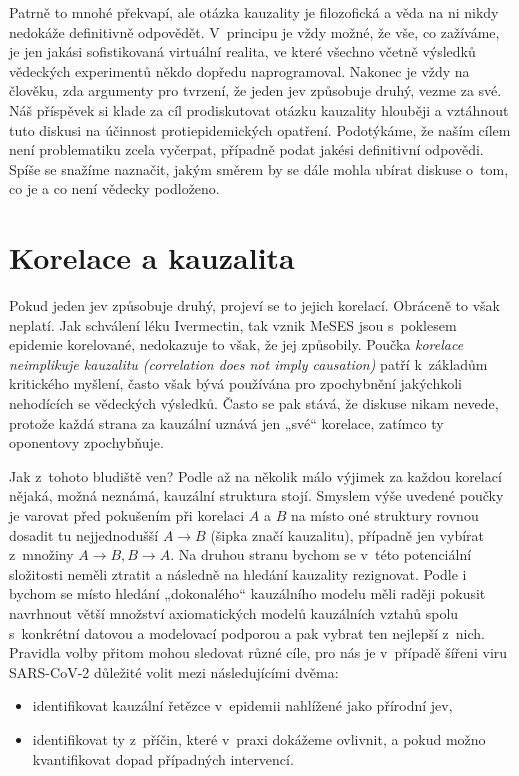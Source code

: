 Patrně to mnohé překvapí, ale otázka kauzality je filozofická a věda na ni nikdy nedokáže definitivně odpovědět. V~principu je vždy možné, že vše, co zažíváme, je jen jakási sofistikovaná
virtuální realita, ve které všechno včetně výsledků vědeckých experimentů
někdo dopředu naprogramoval. Nakonec je vždy na člověku, zda argumenty
pro tvrzení, že jeden jev způsobuje druhý, vezme za své. Náš příspěvek
si klade za cíl prodiskutovat otázku kauzality hlouběji a vztáhnout
tuto diskusi na účinnost
protiepidemických opatření. Podotýkáme, že naším cílem není problematiku
zcela vyčerpat, případně podat jakési definitivní odpovědi. Spíše se snažíme
naznačit, jakým směrem by se dále mohla ubírat diskuse o~tom, co je
a co není vědecky podloženo.

\section*{Korelace a kauzalita}

Pokud jeden jev způsobuje druhý, projeví se to jejich korelací. Obráceně to však neplatí. Jak schválení léku Ivermectin, tak vznik MeSES jsou s~poklesem epidemie korelované, nedokazuje to však, že jej způsobily. Poučka {\em korelace neimplikuje kauzalitu (correlation does not imply causation)} patří k~základům kritického myšlení, často však bývá používána pro zpochybnění jakýchkoli nehodících se vědeckých výsledků. Často se pak stává, že diskuse nikam nevede, protože každá strana za kauzální uznává jen „své“ korelace, zatímco ty oponentovy zpochybňuje.

Jak z~tohoto bludiště ven? Podle \cite{shipley_2000} až na několik málo výjimek za každou korelací nějaká, možná neznámá, kauzální struktura stojí. Smyslem výše uvedené poučky je varovat před pokušením při korelaci $A$ a $B$ na místo oné struktury rovnou dosadit tu nejjednodušší $A\rightarrow B$ (šipka značí kauzalitu), případně jen vybírat z~množiny $A\rightarrow B, B\rightarrow A$. Na druhou stranu bychom se v~této potenciální složitosti neměli ztratit a následně na hledání kauzality rezignovat. Podle \cite{shipley_2000} i \cite{pearl2009causality} bychom se místo hledání „dokonalého“ kauzálního modelu měli raději pokusit navrhnout větší množství axiomatických modelů kauzálních vztahů spolu s~konkrétní datovou a modelovací podporou a pak vybrat ten nejlepší z~nich. Pravidla volby přitom mohou sledovat různé cíle, pro nás je v~případě šířeni viru SARS-CoV-2 důležité volit mezi následujícími dvěma:
\begin{itemize}
\item identifikovat kauzální řetězce v~epidemii nahlížené jako přírodní jev,
\item identifikovat ty z~příčin, které v~praxi dokážeme ovlivnit, a pokud možno kvantifikovat dopad případných intervencí.
\end{itemize}

